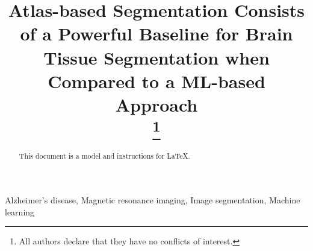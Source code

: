 \documentclass[conference]{IEEEtran}
\begin{document}
\title{Atlas-based Segmentation Consists of a Powerful Baseline for Brain Tissue Segmentation when Compared to a ML-based Approach\\
\thanks{All authors declare that they have no conflicts of interest.}
}

\author{
\and
{}
\and
{}
}

\maketitle

\begin{abstract}
This document is a model and instructions for \LaTeX.
\end{abstract}

\begin{IEEEkeywords}
Alzheimer's disease, Magnetic resonance imaging, Image segmentation, Machine learning
\end{IEEEkeywords}








\end{document}
